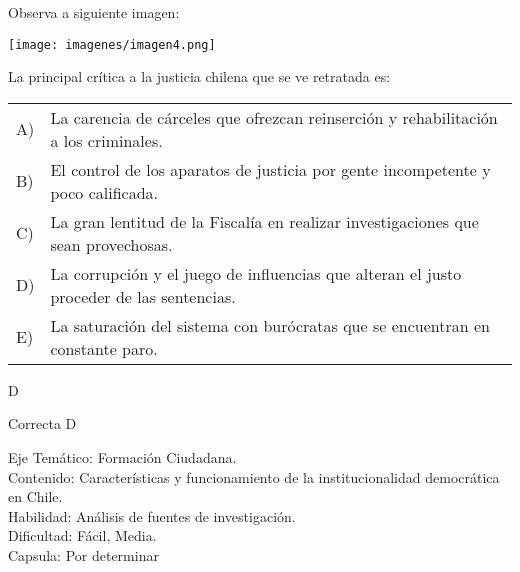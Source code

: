 \documentclass[letterpaper,11pt]{article}
\newcommand{\anchopregunta}{0.9\textwidth}
\begin{document}
\begin{enumerate}
\begin{minipage}{\anchopregunta}
\item Observa a siguiente imagen:
\begin{center}
    \texttt{[image: imagenes/imagen4.png]}
\end{center}
La principal crítica a la justicia chilena que se ve retratada es:
\begin{flushleft}\begin{tabular}{@{\hspace{-.001\textwidth}}l@{\hspace{2pt}}p{}}
A)& La carencia de cárceles que ofrezcan reinserción y rehabilitación a los criminales.\\
B)& El control de los aparatos de justicia por gente incompetente y poco calificada.\\
C)& La gran lentitud de la Fiscalía en realizar investigaciones que sean provechosas.\\
D)& La corrupción y el juego de influencias que alteran el justo proceder de las sentencias.\\
E)& La saturación del sistema con  burócratas que se encuentran en constante paro.\\ 
\end{tabular}\end{flushleft}%
\begin{key} D
\end{key} 
\begin{hint}
\end{hint}
\begin{answer} Correcta D \\
\end{answer}
\begin{info} %
\begin{flushleft}
Eje Temático: Formación Ciudadana.\\
Contenido: Características y funcionamiento de la institucionalidad democrática en Chile.\\
Habilidad: Análisis de fuentes de investigación.\\
Dificultad: Fácil, Media.\\
Capsula: Por determinar \\
\end{flushleft} 
\end{info}
\end{minipage}\vfill$\;$ %


\end{enumerate}
\end{document}
